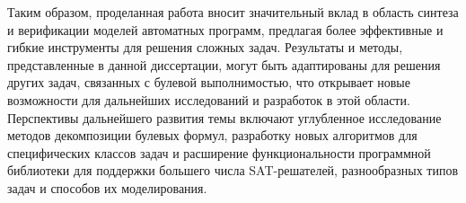 Таким образом, проделанная работа вносит значительный вклад в область синтеза и верификации моделей автоматных программ, предлагая более эффективные и гибкие инструменты для решения сложных задач.
Результаты и методы, представленные в данной диссертации, могут быть адаптированы для решения других задач, связанных с булевой выполнимостью, что открывает новые возможности для дальнейших исследований и разработок в этой области.
Перспективы дальнейшего развития темы включают углубленное исследование методов декомпозиции булевых формул, разработку новых алгоритмов для специфических классов задач и расширение функциональности программной библиотеки для поддержки большего числа SAT-решателей, разнообразных типов задач и способов их моделирования.
